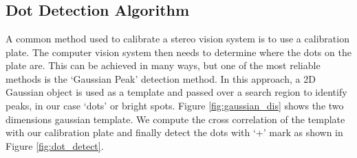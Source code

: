 \chapter{}


\section{Dot Detection Algorithm}

A common method used to calibrate a stereo vision system is to use a calibration plate. The computer vision system then needs to determine where the dots on the plate are. This can be achieved in many ways, but one of the most reliable methods is the ‘Gaussian Peak’ detection method. In this approach, a 2D Gaussian object is used as a template and passed over a search region to identify peaks, in our case ‘dots’ or bright spots. Figure \ref{fig:gaussian_dis} shows the two dimensions gaussian template. We compute the cross correlation of the template with our calibration plate and finally detect the dots with `+' mark as shown in Figure \ref{fig:dot_detect}.

